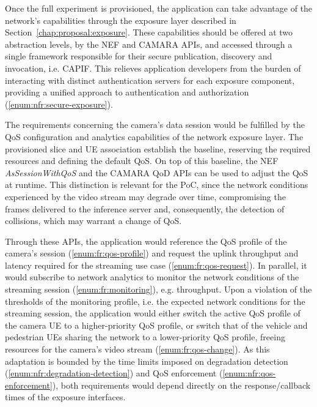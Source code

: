 Once the full experiment is provisioned, the application can take advantage of the network's capabilities through the exposure layer described in Section~\ref{chap:proposal:exposure}. These capabilities should be offered at two abstraction levels, by the \acs{NEF} and CAMARA \acsp{API}, and accessed through a single framework responsible for their secure publication, discovery and invocation, i.e. \acs{CAPIF}. This relieves application developers from the burden of interacting with distinct authentication servers for each exposure component, providing a unified approach to authentication and authorization (\ref{enum:nfr:secure-exposure}).

The requirements concerning the camera's data session would be fulfilled by the \acs{QoS} configuration and analytics capabilities of the network exposure layer. The provisioned slice and \acs{UE} association establish the baseline, reserving the required resources and defining the default \acs{QoS}. On top of this baseline, the \acs{NEF} \textit{AsSessionWithQoS} and the CAMARA \acs{QoD} \acsp{API} can be used to adjust the \acs{QoS} at runtime. This distinction is relevant for the \acs{PoC}, since the network conditions experienced by the video stream may degrade over time, compromising the frames delivered to the inference server and, consequently, the detection of collisions, which may warrant a change of \acs{QoS}.

Through these \acsp{API}, the application would reference the \acs{QoS} profile of the camera's session (\ref{enum:fr:qos-profile}) and request the uplink throughput and latency required for the streaming use case (\ref{enum:fr:qos-request}). In parallel, it would subscribe to network analytics to monitor the network conditions of the streaming session (\ref{enum:fr:monitoring}), e.g. throughput. Upon a violation of the thresholds of the monitoring profile, i.e. the expected network conditions for the streaming session, the application would either switch the active \acs{QoS} profile of the camera \acs{UE} to a higher-priority \acs{QoS} profile, or switch that of the vehicle and pedestrian \acsp{UE} sharing the network to a lower-priority \acs{QoS} profile, freeing resources for the camera's video stream (\ref{enum:fr:qos-change}). As this adaptation is bounded by the time limits imposed on degradation detection (\ref{enum:nfr:degradation-detection}) and \acs{QoS} enforcement (\ref{enum:nfr:qos-enforcement}), both requirements would depend directly on the response/callback times of the exposure interfaces.

